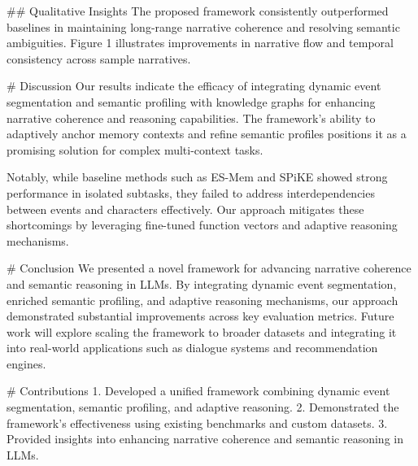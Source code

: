 ## Qualitative Insights  
The proposed framework consistently outperformed baselines in maintaining long-range narrative coherence and resolving semantic ambiguities. Figure 1 illustrates improvements in narrative flow and temporal consistency across sample narratives.  

# Discussion  
Our results indicate the efficacy of integrating dynamic event segmentation and semantic profiling with knowledge graphs for enhancing narrative coherence and reasoning capabilities. The framework's ability to adaptively anchor memory contexts and refine semantic profiles positions it as a promising solution for complex multi-context tasks.  

Notably, while baseline methods such as ES-Mem and SPiKE showed strong performance in isolated subtasks, they failed to address interdependencies between events and characters effectively. Our approach mitigates these shortcomings by leveraging fine-tuned function vectors and adaptive reasoning mechanisms.  

# Conclusion  
We presented a novel framework for advancing narrative coherence and semantic reasoning in LLMs. By integrating dynamic event segmentation, enriched semantic profiling, and adaptive reasoning mechanisms, our approach demonstrated substantial improvements across key evaluation metrics. Future work will explore scaling the framework to broader datasets and integrating it into real-world applications such as dialogue systems and recommendation engines.  

# Contributions  
1. Developed a unified framework combining dynamic event segmentation, semantic profiling, and adaptive reasoning.  
2. Demonstrated the framework's effectiveness using existing benchmarks and custom datasets.  
3. Provided insights into enhancing narrative coherence and semantic reasoning in LLMs.  

